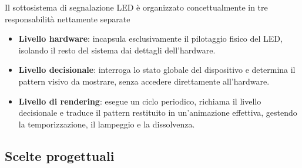 Il sottosistema di segnalazione LED è organizzato concettualmente in tre responsabilità nettamente separate
\begin{itemize}
    \item \textbf{Livello hardware}: incapsula esclusivamente il pilotaggio fisico del LED, isolando il resto del sistema dai dettagli dell'hardware.
    \item \textbf{Livello decisionale}: interroga lo stato globale del dispositivo e determina il pattern visivo da mostrare, senza accedere direttamente all'hardware.
    \item \textbf{Livello di rendering}: esegue un ciclo periodico, richiama il livello decisionale e traduce il pattern restituito in un'animazione effettiva, gestendo 
    la temporizzazione, il lampeggio e la dissolvenza.
\end{itemize}

\subsection{Scelte progettuali}

